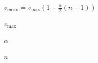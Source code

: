 \documentclass{article}
\begin{document}
$ v_{\text{mean}} = v_{\text{max}} \left(1 - \frac{\alpha}{2} \left( n - 1\right)  \right) $
\pagebreak

$ v_{\text{max}} $
\pagebreak

$ \alpha $
\pagebreak

$ n $
\pagebreak
\end{document}
